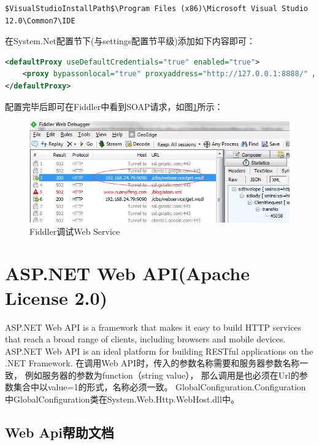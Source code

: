 \documentclass{book}
\begin{document}
\begin{lstlisting}
$VisualStudioInstallPath$\Program Files (x86)\Microsoft Visual Studio 12.0\Common7\IDE
\end{lstlisting}

在System.Net配置节下(与settings配置节平级)添加如下内容即可：

\begin{lstlisting}[language=XML]
<defaultProxy useDefaultCredentials="true" enabled="true">
	<proxy bypassonlocal="true" proxyaddress="http://127.0.0.1:8888/" />
</defaultProxy>
\end{lstlisting}

配置完毕后即可在Fiddler中看到SOAP请求，如图\ref{fig:FiddlerSOAPDebug}所示：

\begin{figure}[htbp]
	\centering
	\includegraphics[scale=0.5]{FiddlerSOAPDebug.jpg}
	\caption{Fiddler调试Web Service}
	\label{fig:FiddlerSOAPDebug}
\end{figure}

\chapter{ASP.NET Web API(Apache License 2.0)}

\clearpage
\mbox{}         
\clearpage

ASP.NET Web API is a framework that makes it easy to build 
HTTP services that reach a broad range of clients, 
including browsers and mobile devices. 
ASP.NET Web API is an ideal platform for building RESTful applications on the .NET Framework.
在调用Web API时，传入的参数名称需要和服务器参数名称一致，
例如服务器的参数为function（string value），
那么调用是也必须在Url的参数集合中以value=1的形式，名称必须一致。
GlobalConfiguration.Configuration中GlobalConfiguration类在System.Web.Http.WebHost.dll中。

\section{Web Api帮助文档}
\end{document}
